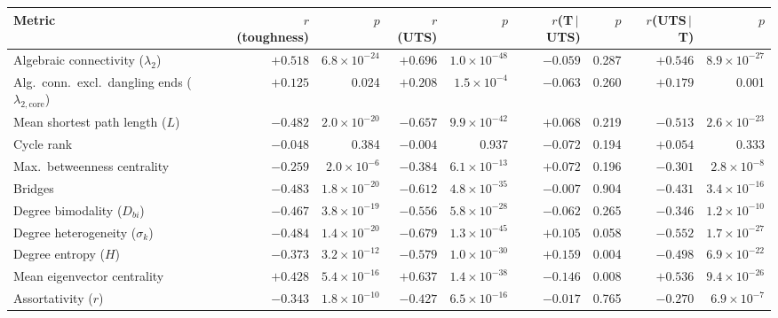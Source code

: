 \begin{tabular}{lrrrrrrrr}
\toprule
Metric & $r$(toughness) & $p$ & $r$(UTS) & $p$ & $r$(T$\,|\,$UTS) & $p$ & $r$(UTS$\,|\,$T) & $p$ \\
\midrule
Algebraic connectivity ($\lambda_2$) & $+0.518$ & $6.8\times10^{-24}$ & $+0.696$ & $1.0\times10^{-48}$ & $-0.059$ & 0.287 & $+0.546$ & $8.9\times10^{-27}$ \\
Alg.\ conn.\ excl.\ dangling ends ($\lambda_{2,\mathrm{core}}$) & $+0.125$ & 0.024 & $+0.208$ & $1.5\times10^{-4}$ & $-0.063$ & 0.260 & $+0.179$ & 0.001 \\
Mean shortest path length ($L$) & $-0.482$ & $2.0\times10^{-20}$ & $-0.657$ & $9.9\times10^{-42}$ & $+0.068$ & 0.219 & $-0.513$ & $2.6\times10^{-23}$ \\
Cycle rank & $-0.048$ & 0.384 & $-0.004$ & 0.937 & $-0.072$ & 0.194 & $+0.054$ & 0.333 \\
Max.\ betweenness centrality & $-0.259$ & $2.0\times10^{-6}$ & $-0.384$ & $6.1\times10^{-13}$ & $+0.072$ & 0.196 & $-0.301$ & $2.8\times10^{-8}$ \\
Bridges & $-0.483$ & $1.8\times10^{-20}$ & $-0.612$ & $4.8\times10^{-35}$ & $-0.007$ & 0.904 & $-0.431$ & $3.4\times10^{-16}$ \\
Degree bimodality ($D_{bi}$) & $-0.467$ & $3.8\times10^{-19}$ & $-0.556$ & $5.8\times10^{-28}$ & $-0.062$ & 0.265 & $-0.346$ & $1.2\times10^{-10}$ \\
Degree heterogeneity ($\sigma_k$) & $-0.484$ & $1.4\times10^{-20}$ & $-0.679$ & $1.3\times10^{-45}$ & $+0.105$ & 0.058 & $-0.552$ & $1.7\times10^{-27}$ \\
Degree entropy ($H$) & $-0.373$ & $3.2\times10^{-12}$ & $-0.579$ & $1.0\times10^{-30}$ & $+0.159$ & 0.004 & $-0.498$ & $6.9\times10^{-22}$ \\
Mean eigenvector centrality & $+0.428$ & $5.4\times10^{-16}$ & $+0.637$ & $1.4\times10^{-38}$ & $-0.146$ & 0.008 & $+0.536$ & $9.4\times10^{-26}$ \\
Assortativity ($r$) & $-0.343$ & $1.8\times10^{-10}$ & $-0.427$ & $6.5\times10^{-16}$ & $-0.017$ & 0.765 & $-0.270$ & $6.9\times10^{-7}$ \\
\bottomrule
\end{tabular}
